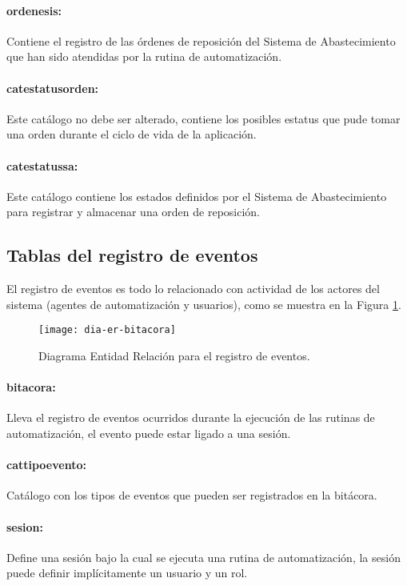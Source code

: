 \paragraph{ordenes{\textunderscore}is:} Contiene el registro de las órdenes de reposición del Sistema de Abastecimiento que han sido atendidas por la rutina de automatización.
\paragraph{cat{\textunderscore}estatus{\textunderscore}orden:} Este catálogo no debe ser alterado, contiene los posibles estatus que pude tomar una orden durante el ciclo de vida de la aplicación.
\paragraph{cat{\textunderscore}estatus{\textunderscore}sa:} Este catálogo contiene los estados definidos por el Sistema de Abastecimiento para registrar y almacenar una orden de reposición.


\subsection{Tablas del registro de eventos}
El registro de eventos es todo lo relacionado con actividad de los actores del sistema (agentes de automatización y usuarios), como se muestra en la Figura \ref{fig:dia-er-bitacora}.
\begin{figure}[h]
  \centering
  \texttt{[image: dia-er-bitacora]} 
  \caption{Diagrama Entidad Relación para el registro de eventos.}
  \label{fig:dia-er-bitacora}
\end{figure}
\paragraph{bitacora:} Lleva el registro de eventos ocurridos durante la ejecución de las rutinas de automatización, el evento puede estar ligado a una sesión.
\paragraph{cat{\textunderscore}tipo{\textunderscore}evento:} Catálogo con los tipos de eventos que pueden ser registrados en la bitácora.
\paragraph{sesion:} Define una sesión bajo la cual se ejecuta una rutina de automatización, la sesión puede definir implícitamente un usuario y un rol.


